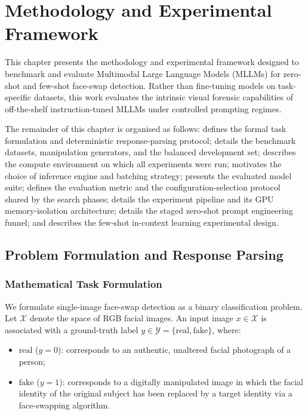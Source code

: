 \chapter{Methodology and Experimental Framework}
\label{chap:methodology}

This chapter presents the methodology and experimental framework designed to benchmark and evaluate Multimodal Large Language Models (MLLMs) for zero-shot and few-shot face-swap detection. Rather than fine-tuning models on task-specific datasets, this work evaluates the intrinsic visual forensic capabilities of off-the-shelf instruction-tuned MLLMs under controlled prompting regimes.

The remainder of this chapter is organised as follows:
 defines the formal task formulation and deterministic response-parsing protocol;
 details the benchmark datasets, manipulation generators, and the balanced development set;
 describes the compute environment on which all experiments were run;
 motivates the choice of inference engine and batching strategy;
 presents the evaluated model suite;
 defines the evaluation metric and the configuration-selection protocol shared by the search phases;
 details the experiment pipeline and its GPU memory-isolation architecture;
 details the staged zero-shot prompt engineering funnel; and
 describes the few-shot in-context learning experimental design.

\section{Problem Formulation and Response Parsing}
\label{sec:formulation}

\subsection{Mathematical Task Formulation}

We formulate single-image face-swap detection as a binary classification problem. Let $\mathcal{X}$ denote the space of RGB facial images. An input image $x \in \mathcal{X}$ is associated with a ground-truth label $y \in \mathcal{Y} = \{\text{real}, \text{fake}\}$, where:
\begin{itemize}
    \item $\text{real}$ ($y = 0$): corresponds to an authentic, unaltered facial photograph of a person;
    \item $\text{fake}$ ($y = 1$): corresponds to a digitally manipulated image in which the facial identity of the original subject has been replaced by a target identity via a face-swapping algorithm.
\end{itemize}

